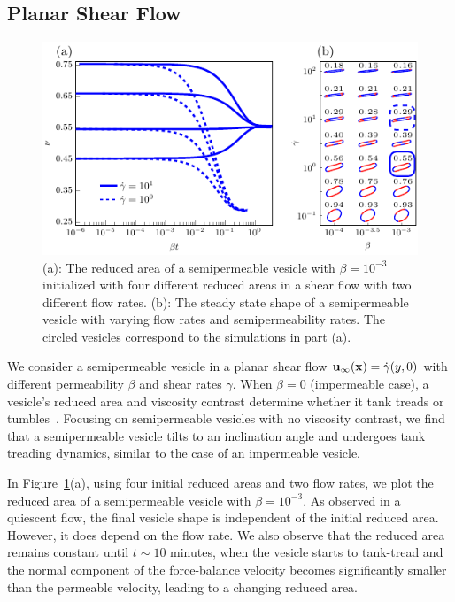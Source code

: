 \documentclass[9pt,twocolumn,twoside,lineno]{pnas-new}
\newif\ifTikz
\begin{document}
\subsection*{Planar Shear Flow}
\begin{figure}[htp]
  \centering
  \ifTikz
  
  \else
  \includegraphics{figures/shearComposite.pdf}
  \fi
  \caption{\label{fig:shearComposite} (a): The reduced area of a
  semipermeable vesicle with $\beta = 10^{-3}$ initialized with four
  different reduced areas in a shear flow with two different flow rates.
  (b): The steady state shape of a semipermeable vesicle with varying
  flow rates and semipermeability rates. The circled vesicles correspond
  to the simulations in part (a).}
\end{figure}

We consider a semipermeable vesicle in a planar shear flow
$\mathbf{u}_{\infty}(\mathbf{x}) = \dot{\gamma} (y,0)$ with different permeability
$\beta$ and shear rates $\dot{\gamma}$. When $\beta=0$ (impermeable
case), a vesicle's reduced area and viscosity contrast determine whether
it tank treads or tumbles~\cite{fin-lam-sei-gom2008,
kra-win-sei-lip1996}. Focusing on semipermeable vesicles with no
viscosity contrast, we find that a semipermeable vesicle tilts to an
inclination angle and undergoes tank treading dynamics, similar to the
case of an impermeable vesicle.

In Figure~\ref{fig:shearComposite}(a), using four initial reduced areas
and two flow rates, we plot the reduced area of a semipermeable vesicle
with $\beta = 10^{-3}$. As observed in a quiescent flow, the final
vesicle shape is independent of the initial reduced area. However, it
does depend on the flow rate. We also observe that the reduced area
remains constant until $t\sim 10$ minutes, when the vesicle starts to
tank-tread and the normal component of the force-balance velocity
becomes significantly smaller than the permeable velocity, leading to a
changing reduced area.
\end{document}
